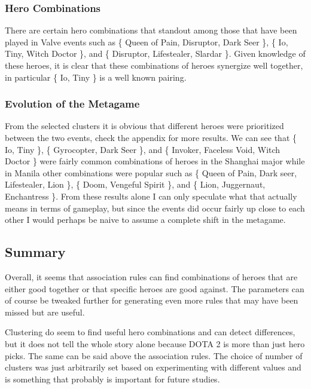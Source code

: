 \documentclass[result.tex]{subfiles}
\begin{document}
\subsubsection*{Hero Combinations}

There are certain hero combinations that standout among those that have been played in Valve events such as \{ Queen of Pain, Disruptor, Dark Seer \}, \{ Io, Tiny, Witch Doctor \}, and  \{ Disruptor, Lifestealer, Slardar \}. Given knowledge of these heroes, it is clear that these combinations of heroes synergize well together, in particular \{ Io, Tiny \} is a well known pairing.

\subsubsection*{Evolution of the Metagame}

From the selected clusters it is obvious that different heroes were prioritized between the two events, check the appendix for more results. We can see that \{ Io, Tiny \}, \{ Gyrocopter, Dark Seer \}, and \{ Invoker, Faceless Void, Witch Doctor \} were fairly common combinations of heroes in the Shanghai major while in Manila other combinations were popular such as \{ Queen of Pain, Dark seer, Lifestealer, Lion \}, \{ Doom, Vengeful Spirit \}, and \{ Lion, Juggernaut, Enchantress \}. From these results alone I can only speculate what that actually means in terms of gameplay, but since the events did occur fairly up close to each other I would perhaps be naive to assume a complete shift in the metagame.


\subsection*{Summary}

Overall, it seems that association rules can find combinations of heroes that are either good together or that specific heroes are good against. The parameters can of course be tweaked further for generating even more rules that may have been missed but are useful.

Clustering do seem to find useful hero combinations and can detect differences, but it does not tell the whole story alone because DOTA 2 is more than just hero picks. The same can be said above the association rules. The choice of number of clusters was just arbitrarily set based on experimenting with different values and is something that probably is important for future studies.
\end{document}
